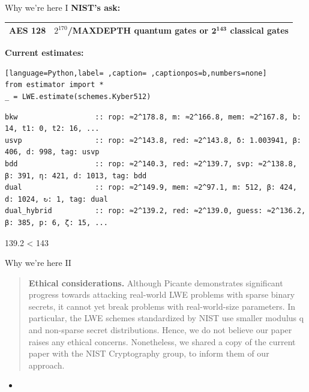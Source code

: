 \documentclass[xcolor=table,10pt,aspectratio=169]{beamer}
\begin{document}
\begin{frame}[label={sec:org1949319},fragile]{Why we're here I}
 \textbf{NIST's ask:}

\begin{center}
\begin{tabular}{ll}
\toprule
AES 128 & \(2^{170}\)/MAXDEPTH quantum gates or \(\mathbf{2^{143}}\) classical gates\footnotemark\\[0pt]
\bottomrule
\end{tabular}

\end{center}

\textbf{Current estimates:}

\begin{lstlisting}[language=Python,label= ,caption= ,captionpos=b,numbers=none]
from estimator import *
_ = LWE.estimate(schemes.Kyber512)
\end{lstlisting}

\begin{verbatim}
bkw                  :: rop: ≈2^178.8, m: ≈2^166.8, mem: ≈2^167.8, b: 14, t1: 0, t2: 16, ...
usvp                 :: rop: ≈2^143.8, red: ≈2^143.8, δ: 1.003941, β: 406, d: 998, tag: usvp
bdd                  :: rop: ≈2^140.3, red: ≈2^139.7, svp: ≈2^138.8, β: 391, η: 421, d: 1013, tag: bdd
dual                 :: rop: ≈2^149.9, mem: ≈2^97.1, m: 512, β: 424, d: 1024, ↻: 1, tag: dual
dual_hybrid          :: rop: ≈2^139.2, red: ≈2^139.0, guess: ≈2^136.2, β: 385, p: 6, ζ: 15, ...
\end{verbatim}

\begin{center}
\alert{{139.2 < 143}}
\end{center}
\end{frame}

\begin{frame}[label={sec:org6645cd2}]{Why we're here II}
\begin{quote}
\textbf{Ethical considerations.} Although Picante demonstrates significant progress towards attacking real-world LWE problems with sparse binary secrets, \alert{it cannot yet break} problems with real-world-size parameters. In particular, the LWE schemes standardized by NIST use smaller modulus q and non-sparse secret distributions. Hence, we do not believe our paper raises any ethical concerns. Nonetheless, we shared a copy of the current paper with the NIST Cryptography group, to inform them of our approach.
\end{quote}

\begin{itemize}
\item {\footnotesize {} \par}
\end{itemize}
\end{frame}
\end{document}
